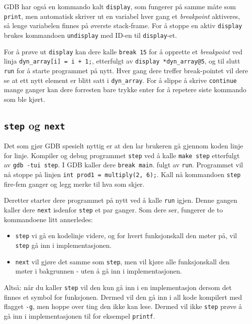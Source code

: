 GDB har også en kommando kalt \verb|display|, som fungerer på samme måte som \verb|print|, men automatisk skriver ut en variabel hver gang et \textit{breakpoint} aktiveres, så lenge variabelen finnes på øverste stack-frame. For å stoppe en aktiv \verb|display| brukes kommandoen \verb|undisplay| med ID-en til \verb|display|-et.

For å prøve ut \verb|display| kan dere kalle \verb|break 15| for å opprette et \textit{breakpoint} ved linja \verb|dyn_array[i] = i + 1;|, etterfulgt av \verb|display *dyn_array@5|, og til slutt \verb|run| for å starte programmet på nytt. Hver gang dere treffer break-pointet vil dere se at ett nytt element er blitt satt i \verb|dyn_array|. For å slippe å skrive \verb|continue| mange ganger kan dere forresten bare trykke enter for å repetere siste kommando som ble kjørt.

\subsection{\texttt{step} og \texttt{next}}

Det som gjør GDB spesielt nyttig er at den lar brukeren gå gjennom koden linje for linje. Kompiler og debug programmet \verb|step| ved å kalle \verb|make step| etterfulgt av \verb|gdb -tui step|. I GDB kaller dere \verb|break main|. fulgt av \verb|run|. Programmet vil nå stoppe på linjen \verb|int prod1 = multiply(2, 6);|. Kall nå kommandoen \verb|step| fire-fem ganger og legg merke til hva som skjer.

Deretter starter dere programmet på nytt ved å kalle \verb|run| igjen. Denne gangen kaller dere \verb|next| isdenfor \verb|step| et par ganger. Som dere ser, fungerer de to kommandoene litt annerledes:

\begin{itemize}
    \item \verb|step| vi gå en kodelinje videre, og for hvert funksjonskall den møter på, vil \verb|step| gå inn i implementasjonen.
    \item \verb|next| vil gjøre det samme som \verb|step|, men vil kjøre alle funksjonskall den møter i bakgrunnen - uten å gå inn i implementasjonen.
\end{itemize}

Altså: når du kaller \verb|step| vil den kun gå inn i en implementasjon dersom det finnes et symbol for funksjonen. Dermed vil den gå inn i all kode kompilert med flagget \verb|-g|, men hoppe over ting den ikke kan lese. Dermed vil ikke \verb|step| prøve å gå inn i implementasjonen til for eksempel \verb|printf|.

